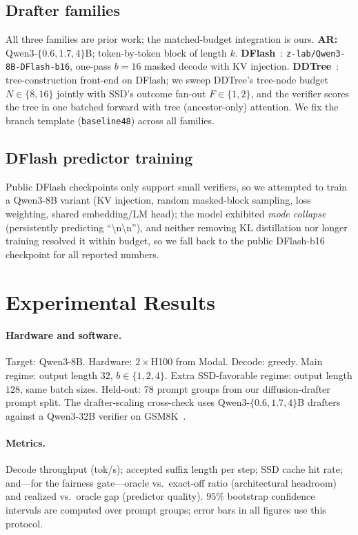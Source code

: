 \documentclass{article}
\begin{document}
\subsection{Drafter families}
\label{ssec:families}
All three families are prior work; the matched-budget integration is ours.
\textbf{AR:} Qwen3-$\{0.6,1.7,4\}$B; token-by-token block of length $k$.
\textbf{DFlash}~\citep{dflash2025}: \texttt{z-lab/Qwen3-8B-DFlash-b16}, one-pass $b{=}16$ masked decode with KV injection.
\textbf{DDTree}~\citep{ringel2026ddtree}: tree-construction front-end on DFlash; we sweep DDTree's tree-node budget $N\in\{8,16\}$ jointly with SSD's outcome fan-out $F\in\{1,2\}$, and the verifier scores the tree in one batched forward with tree (ancestor-only) attention.
We fix the branch template (\texttt{baseline48}) across all families.

\subsection{DFlash predictor training}
Public DFlash checkpoints only support small verifiers, so we attempted to train a Qwen3-8B variant (KV injection, random masked-block sampling, loss weighting, shared embedding/LM head); the model exhibited \emph{mode collapse} (persistently predicting ``\textbackslash n\textbackslash n''), and neither removing KL distillation nor longer training resolved it within budget, so we fall back to the public DFlash-b16 checkpoint for all reported numbers.

\section{Experimental Results}
\label{sec:exp}

\paragraph{Hardware and software.}
Target: Qwen3-8B.
Hardware: $2{\times}$H100 from Modal.
Decode: greedy.
Main regime: output length $32$, $b\in\{1,2,4\}$.
Extra SSD-favorable regime: output length $128$, same batch sizes.
Held-out: 78 prompt groups from our diffusion-drafter prompt split.
The drafter-scaling cross-check uses Qwen3-$\{0.6,1.7,4\}$B drafters against a Qwen3-32B verifier on GSM8K~\citep{cobbe2021gsm8k}.

\paragraph{Metrics.}
Decode throughput (tok/s); accepted suffix length per step; SSD cache hit rate; and---for the fairness gate---oracle vs.\ exact-off ratio (architectural headroom) and realized vs.\ oracle gap (predictor quality).
$95\%$ bootstrap confidence intervals are computed over prompt groups; error bars in all figures use this protocol.
\end{document}
